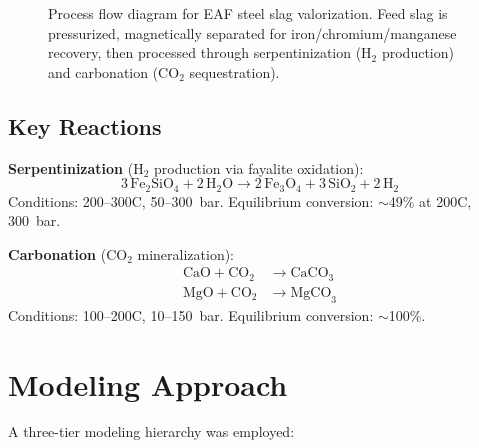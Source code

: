 \documentclass[11pt,a4paper]{article}
\begin{document}
\begin{figure}[H]
\caption{Process flow diagram for EAF steel slag valorization. Feed slag is pressurized,
magnetically separated for iron/chromium/manganese recovery, then processed through
serpentinization (H$_2$ production) and carbonation (CO$_2$ sequestration).}
\label{fig:pfd}
\end{figure}

\subsection{Key Reactions}

\textbf{Serpentinization} (H$_2$ production via fayalite oxidation):
\begin{equation}
3\,\text{Fe}_2\text{SiO}_4 + 2\,\text{H}_2\text{O}
\longrightarrow 2\,\text{Fe}_3\text{O}_4 + 3\,\text{SiO}_2 + 2\,\text{H}_2
\end{equation}
Conditions: 200--300\textdegree C, 50--300~bar. Equilibrium conversion: $\sim$49\% at 200\textdegree C, 300~bar.

\textbf{Carbonation} (CO$_2$ mineralization):
\begin{align}
\text{CaO} + \text{CO}_2 &\longrightarrow \text{CaCO}_3 \label{eq:carb1}\\
\text{MgO} + \text{CO}_2 &\longrightarrow \text{MgCO}_3 \label{eq:carb2}
\end{align}
Conditions: 100--200\textdegree C, 10--150~bar. Equilibrium conversion: $\sim$100\%.

\section{Modeling Approach}

A three-tier modeling hierarchy was employed:
\end{document}
